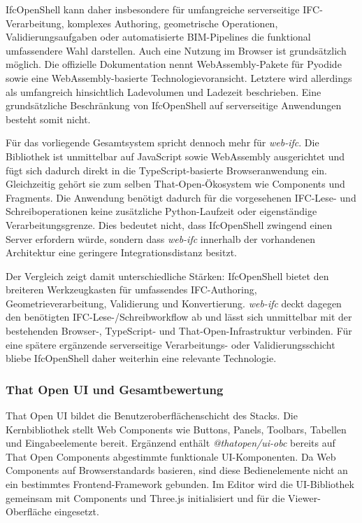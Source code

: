IfcOpenShell kann daher insbesondere für umfangreiche serverseitige IFC-Verarbeitung, komplexes
Authoring, geometrische Operationen, Validierungsaufgaben oder automatisierte BIM-Pipelines die
funktional umfassendere Wahl darstellen. Auch eine Nutzung im Browser ist grundsätzlich möglich. Die
offizielle Dokumentation nennt WebAssembly-Pakete für Pyodide sowie eine WebAssembly-basierte
Technologievoransicht. Letztere wird allerdings als umfangreich hinsichtlich Ladevolumen und
Ladezeit beschrieben. Eine grundsätzliche Beschränkung von IfcOpenShell auf serverseitige
Anwendungen besteht somit nicht.

Für das vorliegende Gesamtsystem spricht dennoch mehr für \textit{web-ifc}. Die Bibliothek ist
unmittelbar auf JavaScript sowie WebAssembly ausgerichtet und fügt sich dadurch direkt in die
TypeScript-basierte Browseranwendung ein. Gleichzeitig gehört sie zum selben That-Open-Ökosystem wie
Components und Fragments. Die Anwendung benötigt dadurch für die vorgesehenen IFC-Lese- und
Schreiboperationen keine zusätzliche Python-Laufzeit oder eigenständige Verarbeitungsgrenze. Dies
bedeutet nicht, dass IfcOpenShell zwingend einen Server erfordern würde, sondern dass
\textit{web-ifc} innerhalb der vorhandenen Architektur eine geringere Integrationsdistanz besitzt.

Der Vergleich zeigt damit unterschiedliche Stärken: IfcOpenShell bietet den breiteren Werkzeugkasten
für umfassendes IFC-Authoring, Geometrieverarbeitung, Validierung und Konvertierung.
\textit{web-ifc} deckt dagegen den benötigten IFC-Lese-/Schreibworkflow ab und lässt sich
unmittelbar mit der bestehenden Browser-, TypeScript- und That-Open-Infrastruktur verbinden. Für
eine spätere ergänzende serverseitige Verarbeitungs- oder Validierungsschicht bliebe IfcOpenShell
daher weiterhin eine relevante Technologie.

\subsubsection{That Open UI und Gesamtbewertung}
That Open UI bildet die Benutzeroberflächenschicht des Stacks. Die Kernbibliothek stellt Web
Components wie Buttons, Panels, Toolbars, Tabellen und Eingabeelemente bereit. Ergänzend enthält
\textit{@thatopen/ui-obc} bereits auf That Open Components abgestimmte funktionale UI-Komponenten.
Da Web Components auf Browserstandards basieren, sind diese Bedienelemente nicht an ein bestimmtes
Frontend-Framework gebunden. Im Editor wird die UI-Bibliothek gemeinsam mit Components und Three.js
initialisiert und für die Viewer-Oberfläche eingesetzt.

